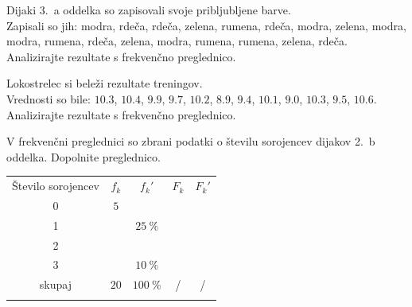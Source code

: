                 

                
                
                    \begin{naloga}
                        Dijaki 3.~a oddelka so zapisovali svoje pribljubljene barve. \\
                        Zapisali so jih: modra, rdeča, rdeča, zelena, rumena, rdeča, modra, zelena, modra, modra, rumena, rdeča, zelena, modra, rumena, rumena, zelena, rdeča. \\
                        Analizirajte rezultate s frekvenčno preglednico. 
                    \end{naloga}

                    \begin{naloga}
                        Lokostrelec si beleži rezultate treningov. \\
                        Vrednosti so bile: $10.3$, $10.4$, $9.9$, $9.7$, $10.2$, $8.9$, $9.4$, $10.1$, $9.0$, $10.3$, $9.5$, $10.6$. \\
                        Analizirajte rezultate s frekvenčno preglednico. 
                    \end{naloga}
                

                
        
                   \begin{naloga}
                    
                    V frekvenčni preglednici so zbrani podatki o številu sorojencev dijakov 2.~b oddelka.
                    Dopolnite preglednico.
    
                        \begin{table}[H]
                            \centering
                            \begin{tabular}{||c|c|c|c|c||} 
                            \hhline{|t:=====:t|}
                            \rowcolor[rgb]{0.843,0.718,0.718} 
                            Število sorojencev  & $f_k$ & $f_k'$ & $F_k$ & $F_k'$   \\ 
                            \hhline{|:=====:|}
                            0 & $5$  & & &  \\ 
                            \hline
                            1 & & $25~\%$ & &    \\ 
                            \hline
                            2 & & & &    \\ 
                            \hline
                            3 & & $10~\%$ & &   \\
                            \hline
                            skupaj & $20$ & $100~\%$ & / & /    \\
                            \hhline{|b:=====:b|}
                            \end{tabular}
                        \end{table}
                    \end{naloga}
    
